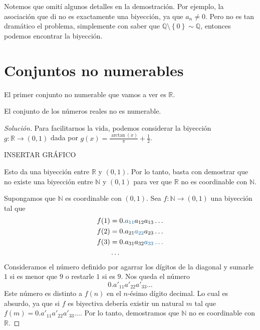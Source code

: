 Notemos que omití algunos detalles en la demostración. Por ejemplo, la asociación que di no es exactamente una biyección, ya que $a_n \neq 0$. Pero no es tan dramático el problema, simplemente con saber que $\mathbb{Q} \setminus \left\{ 0 \right\} \sim \mathbb{Q}$, entonces podemos encontrar la biyección.

\section{Conjuntos no numerables}

El primer conjunto no numerable que vamos a ver es $\mathbb{R}$.

\begin{proposition}
	El conjunto de los números reales no es numerable.
\end{proposition}

\begin{proof}[Solución]
	Para facilitarnos la vida, podemos considerar la biyección $g: \mathbb{R} \to (0, 1)$ dada por $g(x) = \frac{\arctan (x)}{\pi} + \frac{1}{2}$.
	\begin{center}
		\color{red} INSERTAR GRÁFICO
	\end{center}
	Esto da una biyección entre $\mathbb{R}$ y $(0, 1)$. Por lo tanto, basta con demostrar que no existe una biyección entre $\mathbb{N}$ y $(0, 1)$ para ver que $\mathbb{R}$ no es coordinable con $\mathbb{N}$.

	Supongamos que $\mathbb{N}$ es coordinable con $(0, 1)$. Sea $f: \mathbb{N} \to (0, 1)$ una biyección tal que
	\begin{align*}
		f(1) & = 0.\textcolor{accentcolor}{a_{11}} a_{12}a_{13}\dots \\
		f(2) & = 0.a_{21}\textcolor{accentcolor}{a_{22}}a_{23}\dots  \\
		f(3) & = 0.a_{31}a_{32}\color{accentcolor}{a_{33}}\dots      \\
		     & \dots
	\end{align*}
	Consideramos el número definido por agarrar los dígitos de la diagonal y sumarle $1$ si es menor que $9$ o restarle $1$ si es $9$. Nos queda el número
	\begin{equation*}
		0.a'_{11}a'_{22}a'_{33}\dots
	\end{equation*}
	Este número es distinto a $f(n)$ en el $n$-ésimo dígito decimal. Lo cual es absurdo, ya que si $f$ es biyectiva debería existir un natural $m$ tal que $f(m) = 0.a'_{11}a'_{22}a'_{33}\dots$. Por lo tanto, demostramos que $\mathbb{N}$ no es coordinable con $\mathbb{R}$.
\end{proof}

